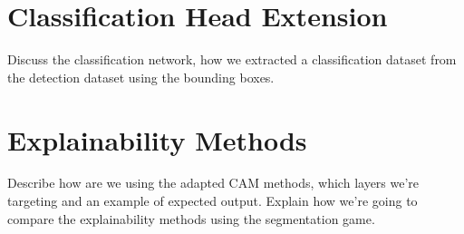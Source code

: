 \section{Classification Head Extension}
Discuss the classification network, how we extracted a classification dataset from the detection dataset using the bounding boxes. 


\section{Explainability Methods}
Describe how are we using the adapted CAM methods, which layers we're targeting and an example of expected output.
Explain how we're going to compare the explainability methods using the segmentation game.